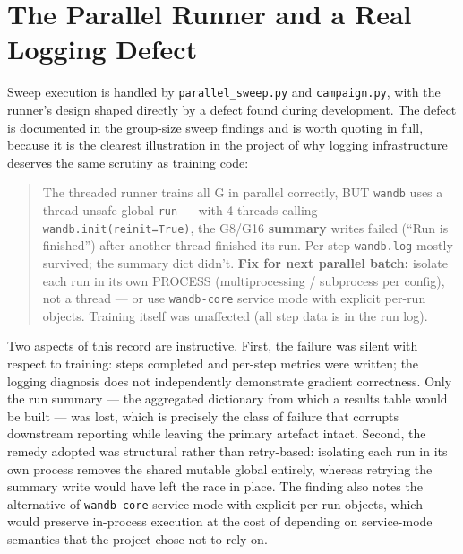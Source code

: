 \documentclass[12pt,a4paper]{report}
\begin{document}
\section{The Parallel Runner and a Real Logging
Defect}\label{the-parallel-runner-and-a-real-logging-defect}

Sweep execution is handled by \texttt{parallel\_sweep.py} and
\texttt{campaign.py}, with the runner's design shaped directly by a
defect found during development. The defect is documented in the
group-size sweep findings and is worth quoting in full, because it is
the clearest illustration in the project of why logging infrastructure
deserves the same scrutiny as training code:

\begin{quote}
The threaded runner trains all G in parallel correctly, BUT
\texttt{wandb} uses a thread-unsafe global \texttt{run} --- with 4
threads calling \texttt{wandb.init(reinit=True)}, the G8/G16
\textbf{summary} writes failed (``Run is finished'') after another
thread finished its run. Per-step \texttt{wandb.log} mostly survived;
the summary dict didn't. \textbf{Fix for next parallel batch:} isolate
each run in its own PROCESS (multiprocessing / subprocess per config),
not a thread --- or use \texttt{wandb-core} service mode with explicit
per-run objects. Training itself was unaffected (all step data is in the
run log).
\end{quote}

Two aspects of this record are instructive. First, the failure was
silent with respect to training: steps completed and per-step metrics
were written; the logging diagnosis does not independently demonstrate
gradient correctness. Only the run summary --- the aggregated dictionary
from which a results table would be built --- was lost, which is
precisely the class of failure that corrupts downstream reporting while
leaving the primary artefact intact. Second, the remedy adopted was
structural rather than retry-based: isolating each run in its own
process removes the shared mutable global entirely, whereas retrying the
summary write would have left the race in place. The finding also notes
the alternative of \texttt{wandb-core} service mode with explicit
per-run objects, which would preserve in-process execution at the cost
of depending on service-mode semantics that the project chose not to
rely on.
\end{document}
